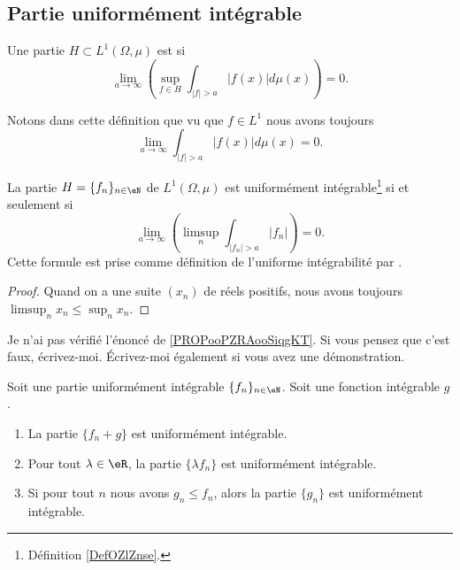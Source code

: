 \subsection{Partie uniformément intégrable}

\begin{definition}  \label{DefOZlZnse}
	Une partie \( H\subset L^1(\Omega,\mu)\) est  si
	\begin{equation}
		\lim_{a\to \infty}\left( \sup_{f\in H}\int_{  | f |>a   }| f(x) |d\mu(x) \right)=0.
	\end{equation}
\end{definition}
Notons dans cette définition que vu que \( f\in L^1\) nous avons toujours
\begin{equation}
	\lim_{a\to \infty}\int_{| f |>a}| f(x) |d\mu(x)=0.
\end{equation}

\begin{lemma}	\label{LEMooUOQDooIkVyWm}
	La partie \( H=\{ f_n \}_{n\in \eN}\) de \( L^1(\Omega,\mu)\) est uniformément intégrable\footnote{Définition \ref{DefOZlZnse}.} si et seulement si
	\begin{equation}
		\lim_{a\to \infty}\left(   \limsup_n\int_{| f_n |>a}| f_n |  \right)=0.
	\end{equation}
	Cette formule est prise comme définition de l'uniforme intégrabilité par \cite{BIBvitali2}.
\end{lemma}

\begin{proof}
	Quand on a une suite \( (x_n)\) de réels positifs, nous avons toujours \( \limsup_nx_n\leq \sup_nx_n \).
\end{proof}

\begin{probleme}
	Je n'ai pas vérifié l'énoncé de \ref{PROPooPZRAooSiqgKT}. Si vous pensez que c'est faux, écrivez-moi. Écrivez-moi également si vous avez une démonstration.
\end{probleme}

\begin{proposition}	\label{PROPooPZRAooSiqgKT}
	Soit une partie uniformément intégrable \( \{ f_n \}_{n\in \eN}\). Soit une fonction intégrable \( g\).
	\begin{enumerate}
		\item
		      La partie \( \{ f_n+g \}\) est uniformément intégrable.
		\item
		      Pour tout \( \lambda\in \eR\), la partie \( \{ \lambda f_n \}\) est uniformément intégrable.
		\item
		      Si pour tout \( n\) nous avons \( g_n\leq f_n\), alors la partie \( \{ g_n \}\) est uniformément intégrable.
	\end{enumerate}
\end{proposition}

